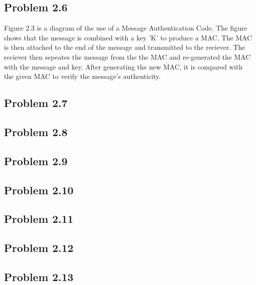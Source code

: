 \documentclass[14pt]{article}
\begin{document}
\subsection{Problem  2.6}
Figure 2.3 is a diagram of the use of a Message Authentication Code. The figure shows that the message is combined with a key 'K' to produce a MAC. The MAC is then attached to the end of the message and transmitted to the reciever. The reciever then sepeates the message from the the MAC and re-generated the MAC with the message and key. After generating the new MAC, it is compared with the given MAC to verify the message's authenticity.
\subsection{Problem  2.7}
\subsection{Problem  2.8}
\subsection{Problem  2.9}
\subsection{Problem  2.10}
\subsection{Problem  2.11}
\subsection{Problem  2.12}
\subsection{Problem  2.13}

\newpage


\end{document}
